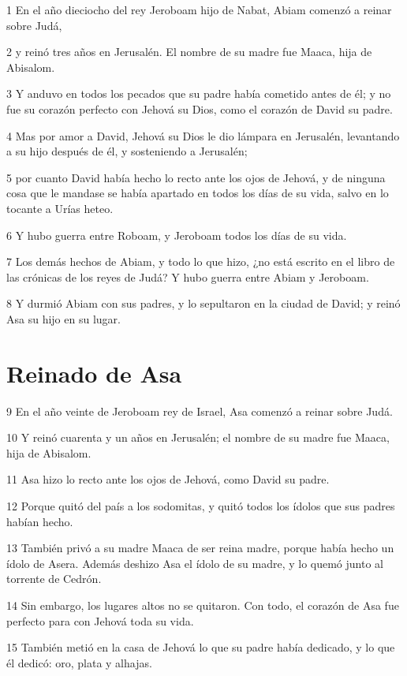 \par 1 En el año dieciocho del rey Jeroboam hijo de Nabat, Abiam comenzó a reinar sobre Judá, 
\par 2 y reinó tres años en Jerusalén. El nombre de su madre fue Maaca, hija de Abisalom.
\par 3 Y anduvo en todos los pecados que su padre había cometido antes de él; y no fue su corazón perfecto con Jehová su Dios, como el corazón de David su padre.
\par 4 Mas por amor a David, Jehová su Dios le dio lámpara en Jerusalén, levantando a su hijo después de él, y sosteniendo a Jerusalén;
\par 5 por cuanto David había hecho lo recto ante los ojos de Jehová, y de ninguna cosa que le mandase se había apartado en todos los días de su vida, salvo en lo tocante a Urías heteo. 
\par 6 Y hubo guerra entre Roboam, y Jeroboam todos los días de su vida. 
\par 7 Los demás hechos de Abiam, y todo lo que hizo, ¿no está escrito en el libro de las crónicas de los reyes de Judá? Y hubo guerra entre Abiam y Jeroboam.
\par 8 Y durmió Abiam con sus padres, y lo sepultaron en la ciudad de David; y reinó Asa su hijo en su lugar.

\section*{Reinado de Asa}

\par 9 En el año veinte de Jeroboam rey de Israel, Asa comenzó a reinar sobre Judá.
\par 10 Y reinó cuarenta y un años en Jerusalén; el nombre de su madre fue Maaca, hija de Abisalom.
\par 11 Asa hizo lo recto ante los ojos de Jehová, como David su padre.
\par 12 Porque quitó del país a los sodomitas, y quitó todos los ídolos que sus padres habían hecho. 
\par 13 También privó a su madre Maaca de ser reina madre, porque había hecho un ídolo de Asera. Además deshizo Asa el ídolo de su madre, y lo quemó junto al torrente de Cedrón.
\par 14 Sin embargo, los lugares altos no se quitaron. Con todo, el corazón de Asa fue perfecto para con Jehová toda su vida.
\par 15 También metió en la casa de Jehová lo que su padre había dedicado, y lo que él dedicó: oro, plata y alhajas. 

